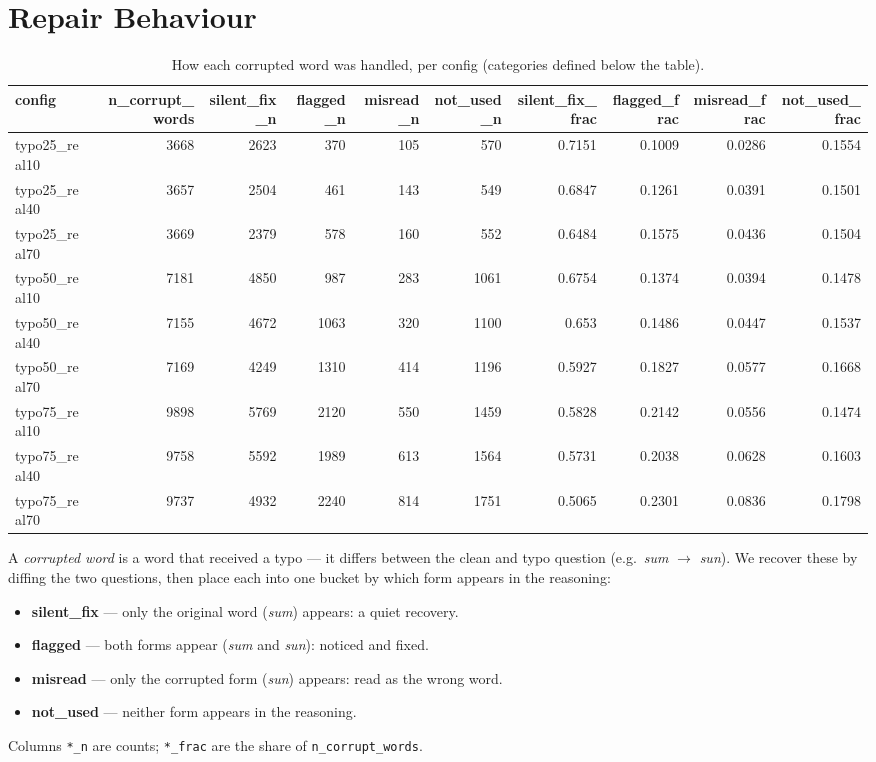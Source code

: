 \documentclass[11pt]{article}
\begin{document}
\section*{Repair Behaviour}
\begin{table}[H]
\centering
\caption{How each corrupted word was handled, per config (categories defined below the table).}
\small
\begin{adjustbox}{max width=\textwidth}
\begin{tabular}{lrrrrrrrrr}
\toprule
\textbf{config} & \textbf{n\_corrupt\_words} & \textbf{silent\_fix\_n} & \textbf{flagged\_n} & \textbf{misread\_n} & \textbf{not\_used\_n} & \textbf{silent\_fix\_frac} & \textbf{flagged\_frac} & \textbf{misread\_frac} & \textbf{not\_used\_frac} \\
\midrule
typo25\_real10 & 3668 & 2623 & 370 & 105 & 570 & 0.7151 & 0.1009 & 0.0286 & 0.1554 \\
typo25\_real40 & 3657 & 2504 & 461 & 143 & 549 & 0.6847 & 0.1261 & 0.0391 & 0.1501 \\
typo25\_real70 & 3669 & 2379 & 578 & 160 & 552 & 0.6484 & 0.1575 & 0.0436 & 0.1504 \\
typo50\_real10 & 7181 & 4850 & 987 & 283 & 1061 & 0.6754 & 0.1374 & 0.0394 & 0.1478 \\
typo50\_real40 & 7155 & 4672 & 1063 & 320 & 1100 & 0.653 & 0.1486 & 0.0447 & 0.1537 \\
typo50\_real70 & 7169 & 4249 & 1310 & 414 & 1196 & 0.5927 & 0.1827 & 0.0577 & 0.1668 \\
typo75\_real10 & 9898 & 5769 & 2120 & 550 & 1459 & 0.5828 & 0.2142 & 0.0556 & 0.1474 \\
typo75\_real40 & 9758 & 5592 & 1989 & 613 & 1564 & 0.5731 & 0.2038 & 0.0628 & 0.1603 \\
typo75\_real70 & 9737 & 4932 & 2240 & 814 & 1751 & 0.5065 & 0.2301 & 0.0836 & 0.1798 \\
\bottomrule
\end{tabular}
\end{adjustbox}
\end{table}

\noindent A \emph{corrupted word} is a word that received a
typo --- it differs between the clean and typo question (e.g.\ \emph{sum} $\to$
\emph{sun}). We recover these by diffing the two questions, then place each into one
bucket by which form appears in the reasoning:
\begin{itemize}\setlength{\itemsep}{1pt}
  \item \textbf{silent\_fix} --- only the original word (\emph{sum}) appears: a quiet recovery.
  \item \textbf{flagged} --- both forms appear (\emph{sum} and \emph{sun}): noticed and fixed.
  \item \textbf{misread} --- only the corrupted form (\emph{sun}) appears: read as the wrong word.
  \item \textbf{not\_used} --- neither form appears in the reasoning.
\end{itemize}
\noindent Columns \texttt{*\_n} are counts; \texttt{*\_frac} are the share of
\texttt{n\_corrupt\_words}.
\medskip
\end{document}
